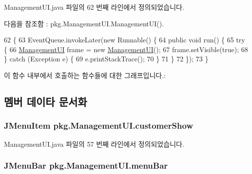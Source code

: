 Management\+U\+I.\+java 파일의 62 번째 라인에서 정의되었습니다.



다음을 참조함 \+:  pkg.\+Management\+U\+I.\+Management\+U\+I().


\begin{DoxyCode}
62                                            \{
63         EventQueue.invokeLater(\textcolor{keyword}{new} Runnable() \{
64             \textcolor{keyword}{public} \textcolor{keywordtype}{void} run() \{
65                 \textcolor{keywordflow}{try} \{
66                     \hyperlink{classpkg_1_1_management_u_i_a1076258b72391ffe3fb851248006efc2}{ManagementUI} frame = \textcolor{keyword}{new} \hyperlink{classpkg_1_1_management_u_i_a1076258b72391ffe3fb851248006efc2}{ManagementUI}();
67                     frame.setVisible(\textcolor{keyword}{true});
68                 \} \textcolor{keywordflow}{catch} (Exception e) \{
69                     e.printStackTrace();
70                 \}
71             \}
72         \});
73     \}
\end{DoxyCode}


이 함수 내부에서 호출하는 함수들에 대한 그래프입니다.\+:




\subsection{멤버 데이타 문서화}
\subsubsection[{\texorpdfstring{customer\+Show}{customerShow}}]{\setlength{\rightskip}{0pt plus 5cm}J\+Menu\+Item pkg.\+Management\+U\+I.\+customer\+Show\hspace{0.3cm}{\ttfamily [private]}}\hypertarget{classpkg_1_1_management_u_i_ada892716bd590c607273c9a9b5353d03}{}\label{classpkg_1_1_management_u_i_ada892716bd590c607273c9a9b5353d03}


Management\+U\+I.\+java 파일의 57 번째 라인에서 정의되었습니다.

\subsubsection[{\texorpdfstring{menu\+Bar}{menuBar}}]{\setlength{\rightskip}{0pt plus 5cm}J\+Menu\+Bar pkg.\+Management\+U\+I.\+menu\+Bar\hspace{0.3cm}{\ttfamily [private]}}\hypertarget{classpkg_1_1_management_u_i_ace9ff91bcebb641b7363e764eae00310}{}\label{classpkg_1_1_management_u_i_ace9ff91bcebb641b7363e764eae00310}



